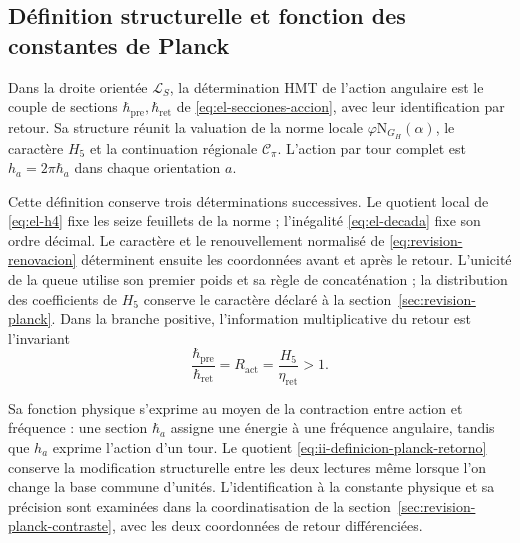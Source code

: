 \subsection{Définition structurelle et fonction des constantes de Planck}
\label{sec:ii-definicion-planck}

\begin{definition}
Dans la droite orientée \(\mathcal L_S\), la détermination HMT de
l'action angulaire est le couple de sections
\(\hbar_{\mathrm{pre}},\hbar_{\mathrm{ret}}\) de
\eqref{eq:el-secciones-accion}, avec leur identification par retour.
Sa structure réunit la valuation de la norme locale
\(\varphi\mathrm N_{G_H}(\alpha)\), le caractère \(H_5\) et la
continuation régionale \(\mathcal C_\pi\). L'action par tour complet
est \(h_a=2\pi\hbar_a\) dans chaque orientation \(a\).
\end{definition}

Cette définition conserve trois déterminations successives. Le quotient
local de \eqref{eq:el-h4} fixe les seize feuillets de la norme ;
l'inégalité \eqref{eq:el-decada} fixe son ordre décimal. Le caractère et
le renouvellement normalisé de \eqref{eq:revision-renovacion} déterminent
ensuite les coordonnées avant et après le retour. L'unicité de la queue
utilise son premier poids et sa règle de concaténation ; la distribution des
coefficients de \(H_5\) conserve le caractère déclaré à la
section~\ref{sec:revision-planck}. Dans la branche positive, l'information
multiplicative du retour est l'invariant
\begin{equation}
 \frac{\hbar_{\mathrm{pre}}}{\hbar_{\mathrm{ret}}}
 =R_{\mathrm{act}}=\frac{H_5}{\eta_{\mathrm{ret}}}>1.
 \label{eq:ii-definicion-planck-retorno}
\end{equation}

Sa fonction physique s’exprime au moyen de la contraction entre action et
fréquence : une section \(\hbar_a\) assigne une énergie à une fréquence
angulaire, tandis que \(h_a\) exprime l’action d’un tour. Le quotient
\eqref{eq:ii-definicion-planck-retorno} conserve la modification
structurelle entre les deux lectures même lorsque l’on change la base commune
d’unités. L’identification à la constante physique et sa précision
sont examinées dans la coordinatisation de la section~\ref{sec:revision-planck-contraste},
avec les deux coordonnées de retour différenciées.
